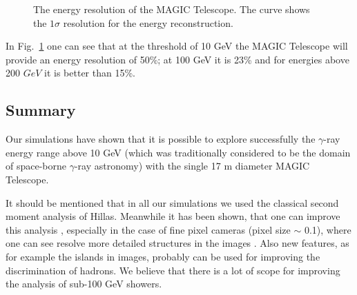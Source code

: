 \begin{figure}[h]
 \begin{center}
  \caption{The energy resolution of the MAGIC Telescope. The curve
shows the $1\sigma$ resolution for the energy 
reconstruction.}
  \label{enres3:fig}
 \end{center}
\end{figure}

In Fig.~\ref{enres3:fig} one can see that at the threshold of 10
GeV the MAGIC Telescope will provide an energy resolution of 50\%; at 100 GeV
it is 23\% and for energies above 200 $GeV$ it is better
than 15\%.

\subsection{Summary}

\medskip Our simulations have shown
that it is
possible to explore successfully the $\gamma$-ray energy range above 10
GeV (which was traditionally considered to be the domain of space-borne
$\gamma$-ray astronomy) with the single 17 m diameter MAGIC Telescope.

It should be mentioned that in all our simulations we used the
classical second moment analysis of Hillas.  Meanwhile it has been
shown, that one can improve this analysis \cite{ulrich:96},
especially in the case of fine pixel cameras (pixel size $\sim$
0.1\tdeg), where one can see resolve more detailed structures
in the images \cite{lebohec:96}. Also new features, as for
example the islands in images, probably can be used for improving the
discrimination of hadrons. We believe that there is a lot of scope for
improving the analysis of sub-100 GeV showers.

